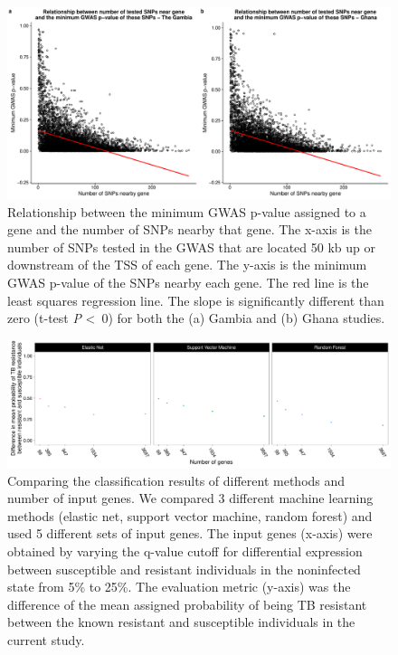 \documentclass[fleqn,10pt]{wlscirep}
\begin{document}
\begin{figure}[ht]
\centering
\includegraphics[width=\linewidth]{../figure/gwas-n-snps.pdf}
\caption{
Relationship between the minimum GWAS p-value assigned to a gene and the number of SNPs nearby that gene. The x-axis is the number of SNPs tested in the GWAS that are located 50 kb up or downstream of the TSS of each gene. The y-axis is the minimum GWAS p-value of the SNPs nearby each gene. The red line is the least squares regression line. The slope is significantly different than zero (t-test \emph{P} \textless \, 0) for both the (a) Gambia and (b) Ghana studies.
}
\label{fig:gwas-n-snps}
\end{figure}

\begin{figure}[ht]
\centering
\includegraphics[width=\linewidth]{../figure/classifier-compare.pdf}
\caption{
Comparing the classification results of different methods and number of input genes. We compared 3 different machine learning methods (elastic net, support vector machine, random forest) and used 5 different sets of input genes. The input genes (x-axis) were obtained by varying the q-value cutoff for differential expression between susceptible and resistant individuals in the noninfected state from 5\% to 25\%. The evaluation metric (y-axis) was the difference of the mean assigned probability of being TB resistant between the known resistant and susceptible individuals in the current study.
}
\label{fig:class-compare}
\end{figure}
\end{document}

